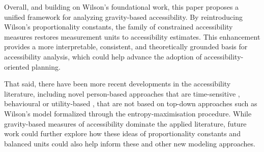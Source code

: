 \documentclass[
  10pt,
  letterpaper,
]{article}
\begin{document}
Overall, and building on Wilson's \citep{wilson1971} foundational work,
this paper proposes a unified framework for analyzing gravity-based
accessibility. By reintroducing Wilson's proportionality constants, the
family of constrained accessibility measures restores measurement units
to accessibility estimates. This enhancement provides a more
interpretable, consistent, and theoretically grounded basis for
accessibility analysis, which could help advance the adoption of
accessibility-oriented planning.

That said, there have been more recent developments in the accessibility
literature, including novel person-based approaches that are
time-sensitive \citep{yang2024evaluating, braga2023evaluating},
behavioural \citep{kar2024inclusive, lu2014effects} or utility-based
\citep{guzman2023much, ben1985discrete}, that are not based on top-down
approaches such as Wilson's model formalized through the
entropy-maximisation procedure. While gravity-based measures of
accessibility dominate the applied literature, future work could further
explore how these ideas of proportionality constants and balanced units
could also help inform these and other new modeling approaches.


\nolinenumbers
  
\end{document}
